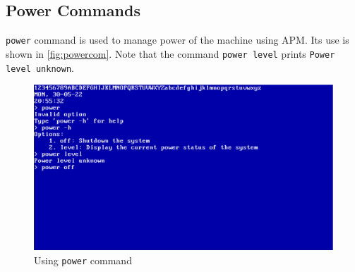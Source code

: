 \subsection{Power Commands}
\texttt{power} command is used to manage power of the machine using APM. Its use is shown in \autoref{fig:powercom}. Note that the command \texttt{power level} prints \texttt{Power level unknown}.
\begin{figure}[H]
  \centering
  \includegraphics[scale=0.25]{figures/powercom.eps}
  \caption{Using \texttt{power} command}
\label{fig:powercom}
\end{figure}

